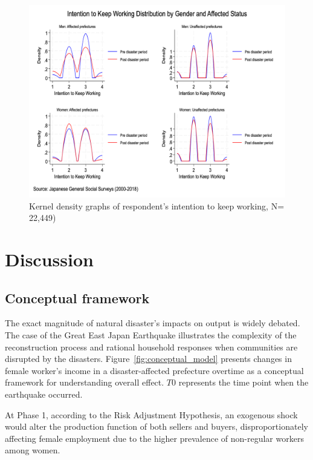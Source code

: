 \documentclass[a4paper,12pt]{article}
\begin{document}
\begin{figure}[h!]
    \centering
    \caption{Kernel density graphs of respondent’s intention to keep working, N= 22,449)}
    \label{tab:intention_to_work}
    \includegraphics[width=1.0\textwidth]{intention_to_keep_working_distribution_combined.png} 
    
\end{figure}



\clearpage





\section{Discussion}
\label{sec5}

\subsection{Conceptual framework}
\label{sec5.1}

The exact magnitude of natural disaster's impacts on output is widely debated. The case of the Great East Japan Earthquake illustrates the complexity of the reconstruction process and rational household responses when communities are disrupted by the disasters. Figure~\ref{fig:conceptual_model} presents changes in female worker's income in a disaster-affected prefecture overtime as a conceptual framework for understanding overall effect. $T0$ represents the time point when the earthquake occurred. 

At Phase 1, according to the Risk Adjustment Hypothesis, an exogenous shock would alter the production function of both sellers and buyers, disproportionately affecting female employment due to the higher prevalence of non-regular workers among women.
\end{document}
